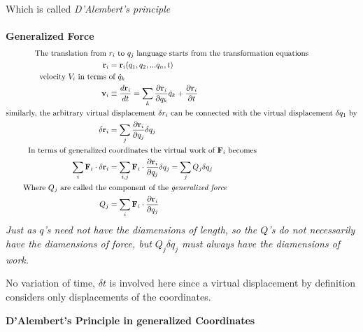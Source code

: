 Which is called \textit{D'Alembert's principle}\\\\
\textbf{Generalized Force}
\begin{align}
\text{The translation from }&\text{$r_i$ to $q_j$ language starts from the transformation equations}\notag\\
\textbf{r}_i&=\textbf{r}_i(q_1,q_2,...q_n,t)\label{EP-07}\\
\text{velocity $V_i$ in terms }&\text{of $\dot{q}_k$}\notag\\
\mathbf{v}_{i} &\equiv \frac{d \mathbf{r}_{i}}{d t}=\sum_{k} \frac{\partial \mathbf{r}_{i}}{\partial q_{k}} \dot{q}_{k}+\frac{\partial \mathbf{r}_{i}}{\partial t}\label{EP-08}\\
\text{similarly, the arbitrary virtual}&\text{ displacement $\delta r_i$ can be connected with the virtual displacement $\delta q_1$ by}\notag\\
\delta \mathbf{r}_{i}&=\sum_{j} \frac{\partial \mathbf{r}_{i}}{\partial q_{j}} \delta q_{j}\\
\text{In terms of generalized }&\text{coordinates the virtual work of $\textbf{F}_i$ becomes}\notag\\
\sum_{i} \mathbf{F}_{i} \cdot \delta \mathbf{r}_{i}&=\sum_{i, j} \mathbf{F}_{i} \cdot \frac{\partial \mathbf{r}_{i}}{\partial q_{j}} \delta q_{j}=\sum_{j} Q_{j} \delta q_{j}\label{EP-10}\\
\text{Where $Q_j$ are called the } &\text{component of the }\textit{generalized force}\notag \\
Q_{j}&=\sum_{i} \mathbf{F}_{i} \cdot \frac{\partial \mathbf{r}_{i}}{\partial q_{j}}\label{EP-11}
\end{align}
\textit{Just as $q$'s need not have the diamensions of length, so the $Q$'s do not necessarily have the diamensions of force, but $Q_j\delta q_j$ must always have the diamensions of work.}
\begin{note}
	No variation of time, $\delta t$ is involved here since a virtual displacement by definition considers only displacements of the coordinates.
\end{note}
\textbf{D'Alembert's Principle in generalized Coordinates}
